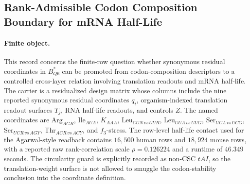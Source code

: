 
\subsection{Rank-Admissible Codon Composition Boundary for mRNA Half-Life}
\label{sec:biorality-q6-rank-admissible-mrna-halflife-agarwal2022}

\paragraph{Finite object.}
This record concerns the finite-row question whether synonymous residual coordinates in $B^*_{Q6}$ can be promoted from codon-composition descriptors to a controlled cross-layer relation involving translation readouts and mRNA half-life.  The carrier is a residualized design matrix whose columns include the nine reported synonymous residual coordinates $q_i$, organism-indexed translation readout surfaces $T_j$, RNA half-life readouts, and controls $Z$.  The named coordinates are $\mathrm{Arg}_{AGR}$, $\mathrm{Ile}_{AUA}$, $K_{AAA}$, $\mathrm{Leu}_{CUN\,vs\,UUR}$, $\mathrm{Leu}_{UUA\,vs\,UUG}$, $\mathrm{Ser}_{UCA\,vs\,UCG}$, $\mathrm{Ser}_{UCR\,vs\,AGY}$, $\mathrm{Thr}_{ACR\,vs\,ACY}$, and $f_3$-stress.  The row-level half-life contact used for the Agarwal-style readback contains $16{,}500$ human rows and $18{,}924$ mouse rows, with a reported raw rank-correlation scale $\rho=0.126224$ and a runtime of $46.349$ seconds.  The circularity guard is explicitly recorded as non-CSC $tAI$, so the translation-weight surface is not allowed to smuggle the codon-stability conclusion into the coordinate definition.

